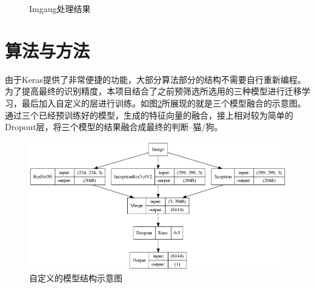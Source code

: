 \documentclass[a4paper,11pt]{article}
\begin{document}
\begin{figure}[htb]
{\label{fig:cat4}
}
\caption{Imgaug处理结果}
\label{fig:cats}
\end{figure}


\section{算法与方法}
\label{sec:orgec56f37}
由于Keras提供了非常便捷的功能，大部分算法部分的结构不需要自行重新编程。为了提高最终的识别精度，本项目结合了之前预筛选所选用的三种模型进行迁移学习，最后加入自定义的层进行训练。如图\ref{fig:selfmodel}所展现的就是三个模型融合的示意图。通过三个已经预训练好的模型，生成的特征向量的融合，接上相对较为简单的Dropout层，将三个模型的结果融合成最终的判断--猫/狗。

\begin{figure}[htb]
\centering
\includegraphics[scale=0.38]{./figure/eg.png}
\caption{自定义的模型结构示意图}
\label{fig:selfmodel}
\end{figure}
\end{document}

